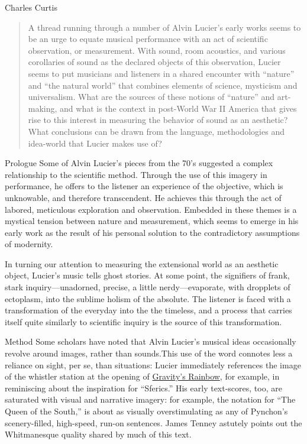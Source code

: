 \documentclass[a4paper,10pt]{report}
\numberwithin{equation}{section}
\begin{document}
\begin{chapter}{Charles Curtis}
\begin{abstract}
 A thread running through a number of Alvin Lucier's early works seems to be an urge to equate musical performance with an act of scientific observation, or measurement. With sound, room acoustics, and various corollaries of sound as the declared objects of this observation, Lucier seems to put musicians and listeners in a shared encounter with ``nature'' and ``the natural world'' that combines elements of science, mysticism and universalism. What are the sources of these notions of ``nature'' and art-making, and what is the context in post-World War II America that gives rise to this interest in measuring the behavior of sound as an aesthetic? What conclusions can be drawn from the language, methodologies and idea-world that Lucier makes use of?
\end{abstract} 
\begin{section}{Prologue}
 Some of Alvin Lucier's pieces from the 70's suggested a complex relationship to the scientific method. Through the use of this imagery in performance, he offers to the listener an experience of the objective, which is unknowable, and therefore transcendent. He achieves this through the act of labored, meticulous exploration and observation. Embedded in these themes is a mystical tension between nature and measurement, which seems to emerge in his early work as the result of his personal solution to the contradictory assumptions of modernity.

In turning our attention to measuring the extensional world as an aesthetic object, Lucier's music tells ghost stories. At some point, the signifiers of frank, stark inquiry---unadorned, precise, a little nerdy---evaporate, with dropplets of ectoplasm, into the sublime holism of the absolute. The listener is faced with a transformation of the everyday into the the timeless, and a process that carries itself quite similarly to scientific inquiry is the source of this transformation. 
\end{section}
\begin{section}{Method}
 Some scholars have noted that Alvin Lucier's musical ideas occasionally revolve around images, rather than sounds.\cite{kuivila2012}This use of the word connotes less a reliance on sight, per se, than situations: Lucier immediately references the image of the whistler station at the opening of \underline{Gravity's Rainbow}, for example, in reminiscing about the inspiration for ``Sferics.''\cite[p.~151]{lucier2012} His early text-scores, too, are saturated with visual and narrative imagery: for example, the notation for ``The Queen of the South,'' is about as visually overstimulating as any of Pynchon's scenery-filled, high-speed, run-on sentences.\cite[350-352]{lucier1995} James Tenney astutely points out the Whitmanesque quality shared by much of this text.\cite[p.~16]{lucier1995}


\end{section}
\end{chapter}
\end{document}
